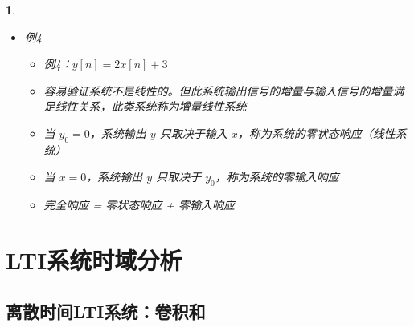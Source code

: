 \documentclass[UTF8]{report}
\theoremstyle{MyLineTheoremStyle} %
\theoremstyle{MyBlockTheoremStyle} %
\theoremstyle{MySubsubsectionStyle} %
\newtheorem{definition}{}
\begin{document}
\begin{definition}
\begin{itemize}
        \item 例4
        \begin{itemize}
            \item 例4：$y[n] = 2x[n] + 3$
            \item 容易验证系统不是线性的。但此系统输出信号的增量与输入信号的增量满足线性关系，此类系统称为增量线性系统
            \item 当 $y_0 = 0$，系统输出 $y$ 只取决于输入 $x$，称为系统的零状态响应（线性系统）
            \item 当 $x = 0$，系统输出 $y$ 只取决于 $y_0$，称为系统的零输入响应
            \item 完全响应 = 零状态响应 + 零输入响应
        \end{itemize}
    \end{itemize}
\end{definition}


\chapter{LTI系统时域分析}

\section{离散时间LTI系统：卷积和}
\end{document}
